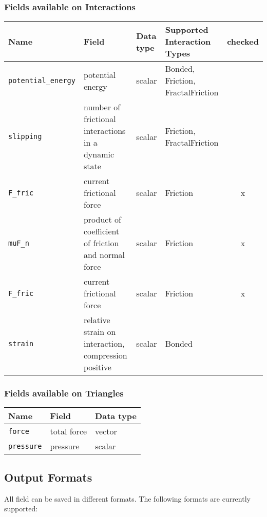 \documentclass{report}
\begin{document}
\subsubsection{Fields available on Interactions}
\par \medskip

\begin{tabular}{|l|p{2.6cm}|l|p{2.5cm}|c|}
\hline
Name & Field & Data type & Supported Interaction Types & checked\\
\hline \hline
\verb{potential_energy{ & potential energy & scalar & Bonded, Friction, FractalFriction &\\
\hline
\verb{slipping{ & number of frictional interactions in a dynamic state & scalar & Friction, FractalFriction &\\
\hline
\verb{F_fric{ & current frictional force & scalar & Friction & x \\
\hline
\verb{muF_n{ & product of coefficient of friction and normal force & scalar & Friction & x \\
\verb{F_fric{ & current frictional force & scalar & Friction & x \\
\hline
\verb{strain{ & relative strain on interaction, compression positive & scalar & Bonded & \\ 
\hline
\end{tabular}

\subsubsection{Fields available on Triangles}
\par \medskip

\begin{tabular}{|l|p{3.5cm}|l|}
\hline
Name & Field & Data type \\
\hline \hline
\verb{force{ & total force & vector \\
\hline
\verb{pressure{ & pressure & scalar \\
\hline
\end{tabular}


\subsection{Output Formats}
\label{sec::OutputFormats}

All field can be saved in different formats. The following formats are currently supported:
   
\end{document}
